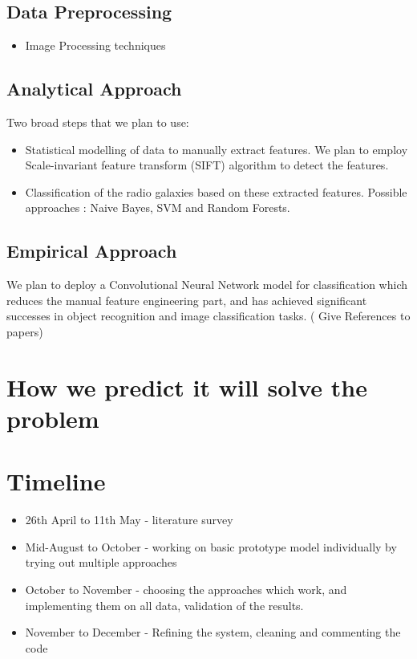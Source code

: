 \documentclass{article}
\begin{document}
\begin{multicols*}{2}
\subsection{Data Preprocessing}

\begin{itemize}
\item Image Processing techniques
\end{itemize}

\subsection{Analytical Approach}

Two broad steps that we plan to use: 
\begin{itemize}
	\item Statistical modelling of data to manually extract features. We plan to employ Scale-invariant feature transform (SIFT) algorithm to detect the features.  
	\item Classification of the radio galaxies based on these extracted features. Possible approaches : Naive Bayes, SVM and Random Forests.
\end{itemize}


\subsection{Empirical Approach}

We plan to deploy a Convolutional Neural Network model for classification which reduces the manual feature engineering part, and has achieved significant successes in object recognition and image classification tasks. ( Give References to papers) 
    


\section{How we predict it will solve the problem}

\section{Timeline}
\begin{itemize}
	\item 26th April to 11th May - literature survey
	\item Mid-August to October - working on basic prototype model individually by trying out multiple approaches
	\item October to November - choosing the approaches which work, and implementing them on all data, validation of the results.
	\item November to December - Refining the system, cleaning and commenting the code
\end{itemize} 






\end{multicols*}
\end{document}
